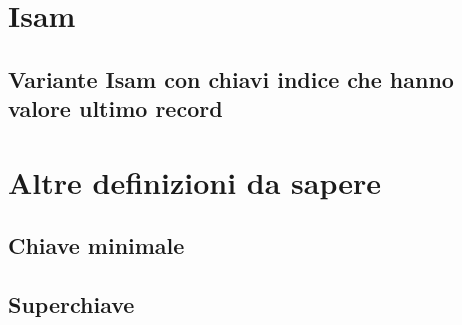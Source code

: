 \documentclass{article}
\begin{document}
\section{Isam}
\subsection{Variante Isam con chiavi indice che hanno valore ultimo record}
\pagebreak
\section{Altre definizioni da sapere}
\subsection{Chiave minimale} 
\subsection{Superchiave}
\end{document}
